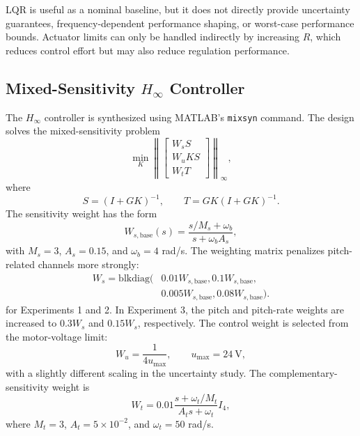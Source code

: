 \documentclass[conference]{IEEEtran}
\begin{document}
LQR is useful as a nominal baseline, but it does not directly provide uncertainty guarantees, frequency-dependent performance shaping, or worst-case performance bounds. Actuator limits can only be handled indirectly by increasing $R$, which reduces control effort but may also reduce regulation performance.

\subsection{Mixed-Sensitivity $H_\infty$ Controller}
The $H_\infty$ controller is synthesized using MATLAB's \texttt{mixsyn} command. The design solves the mixed-sensitivity problem
\begin{equation}
\min_K \left\|
\begin{bmatrix}
W_sS\\
W_uKS\\
W_tT
\end{bmatrix}
\right\|_\infty,
\end{equation}
where
\begin{equation}
S=(I+GK)^{-1},\qquad T=GK(I+GK)^{-1}.
\end{equation}
The sensitivity weight has the form
\begin{equation}
W_{s,\mathrm{base}}(s)=\frac{s/M_s+\omega_b}{s+\omega_b A_s},
\end{equation}
with $M_s=3$, $A_s=0.15$, and $\omega_b=4$ rad/s. The weighting matrix penalizes pitch-related channels more strongly:
\begin{equation}
\begin{aligned}
W_s=\mathrm{blkdiag}(&0.01W_{s,\mathrm{base}},0.1W_{s,\mathrm{base}},\\
&0.005W_{s,\mathrm{base}},0.08W_{s,\mathrm{base}}).
\end{aligned}
\end{equation}
for Experiments 1 and 2. In Experiment 3, the pitch and pitch-rate weights are increased to $0.3W_s$ and $0.15W_s$, respectively. The control weight is selected from the motor-voltage limit:
\begin{equation}
W_u=\frac{1}{4u_{\max}},\qquad u_{\max}=24\ \mathrm{V},
\end{equation}
with a slightly different scaling in the uncertainty study. The complementary-sensitivity weight is
\begin{equation}
W_t=0.01\frac{s+\omega_t/M_t}{A_t s+\omega_t}I_4,
\end{equation}
where $M_t=3$, $A_t=5\times 10^{-2}$, and $\omega_t=50$ rad/s.
\end{document}
